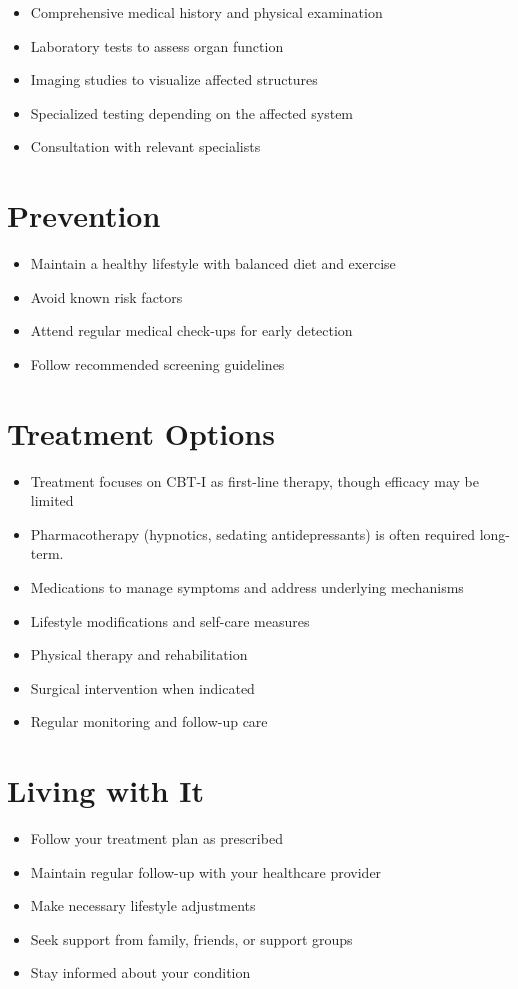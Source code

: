 \begin{itemize}[noitemsep]
  \item Comprehensive medical history and physical examination
  \item Laboratory tests to assess organ function
  \item Imaging studies to visualize affected structures
  \item Specialized testing depending on the affected system
  \item Consultation with relevant specialists
\end{itemize}
\section{Prevention}
\begin{itemize}[noitemsep]
  \item Maintain a healthy lifestyle with balanced diet and exercise
  \item Avoid known risk factors
  \item Attend regular medical check-ups for early detection
  \item Follow recommended screening guidelines
\end{itemize}
\section{Treatment Options}
\begin{itemize}[noitemsep]
  \item Treatment focuses on CBT-I as first-line therapy, though efficacy may be limited
  \item Pharmacotherapy (hypnotics, sedating antidepressants) is often required long-term.
  \item Medications to manage symptoms and address underlying mechanisms
  \item Lifestyle modifications and self-care measures
  \item Physical therapy and rehabilitation
  \item Surgical intervention when indicated
  \item Regular monitoring and follow-up care
\end{itemize}
\section{Living with It}
\begin{itemize}[noitemsep]
  \item Follow your treatment plan as prescribed
  \item Maintain regular follow-up with your healthcare provider
  \item Make necessary lifestyle adjustments
  \item Seek support from family, friends, or support groups
  \item Stay informed about your condition
\end{itemize}
